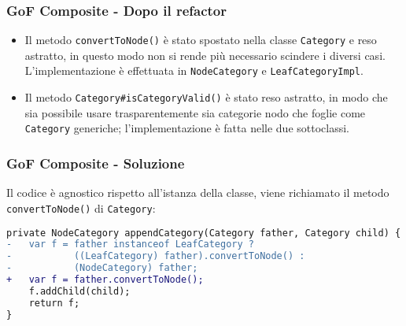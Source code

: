 \begin{frame}
    \frametitle{GoF Composite - Dopo il refactor}

    \begin{minipage}{.43\textwidth}
        \begin{figure}
            \centering
        \end{figure}
    \end{minipage}
    \begin{minipage}{.55\textwidth}
        \begin{itemize}
            \item<1-> Il metodo \texttt{convertToNode()} è stato spostato nella classe \texttt{Category} e reso astratto, in questo modo non si rende più necessario scindere i diversi casi. L'implementazione è effettuata in \texttt{NodeCategory} e \texttt{LeafCategoryImpl}.
            \item<2-> Il metodo \texttt{Category\#isCategoryValid()} è stato reso astratto, in modo che sia possibile usare trasparentemente sia categorie nodo che foglie come \texttt{Category} generiche; l'implementazione è fatta nelle due sottoclassi.
        \end{itemize}
    \end{minipage}

\end{frame}

\begin{frame}[fragile]
    \frametitle{GoF Composite - Soluzione}

    Il codice è agnostico rispetto all'istanza della classe, viene richiamato il metodo \texttt{convertToNode()} di \texttt{Category}:

    \lstset{style=java}
    \begin{lstlisting}[language=diff, caption={Post refactor}]
private NodeCategory appendCategory(Category father, Category child) {
-   var f = father instanceof LeafCategory ?
-           ((LeafCategory) father).convertToNode() : 
-           (NodeCategory) father;
+   var f = father.convertToNode();
    f.addChild(child);
    return f;
}
    \end{lstlisting}

\end{frame}

